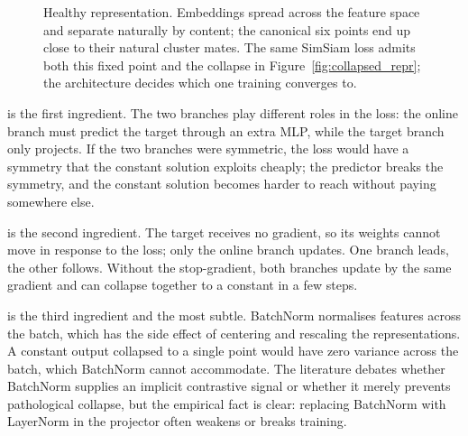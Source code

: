 \begin{figure}
\centering
{}
\caption{Healthy representation. Embeddings spread across the feature space and separate naturally by content; the canonical six points end up close to their natural cluster mates. The same SimSiam loss admits both this fixed point and the collapse in Figure~\ref{fig:collapsed_repr}; the architecture decides which one training converges to.}
\label{fig:healthy_repr}
\end{figure}

 is the first ingredient.
The two branches play different roles in the loss: the online branch must predict the target through an extra MLP, while the target branch only projects.
If the two branches were symmetric, the loss would have a symmetry that the constant solution exploits cheaply; the predictor breaks the symmetry, and the constant solution becomes harder to reach without paying somewhere else.

 is the second ingredient.
The target receives no gradient, so its weights cannot move in response to the loss; only the online branch updates.
One branch leads, the other follows.
Without the stop-gradient, both branches update by the same gradient and can collapse together to a constant in a few steps.

 is the third ingredient and the most subtle.
BatchNorm normalises features across the batch, which has the side effect of centering and rescaling the representations.
A constant output collapsed to a single point would have zero variance across the batch, which BatchNorm cannot accommodate.
The literature debates whether BatchNorm supplies an implicit contrastive signal or whether it merely prevents pathological collapse, but the empirical fact is clear: replacing BatchNorm with LayerNorm in the projector often weakens or breaks training.

